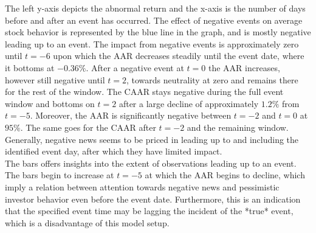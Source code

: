The left y-axis depicts the abnormal return and the x-axis is the number of days before and after an event has occurred. The effect of negative events on average stock behavior is represented by the blue line in the graph, and is mostly negative leading up to an event. The impact from negative events is approximately zero until $t = -6$ upon which the AAR decreases steadily until the event date, where it bottoms at $-0.36\%$. After a negative event at $t=0$ the AAR increases, however still negative until $t=2$, towards neutrality at zero and remains there for the rest of the window. The CAAR stays negative during the full event window and bottoms on $t=2$ after a large decline of approximately $1.2\%$ from  $t=-5$. Moreover, the AAR is significantly negative between $t=-2$ and $t=0$ at $95\%$. The same goes for the CAAR after $t=-2$ and the remaining window. Generally, negative news seems to be priced in leading up to and including the identified event day, after which they have limited impact. \\ 
The bars offers insights into the extent of observations leading up to an event. The bars begin to increase at $t=-5$ at which the AAR begins to decline, which imply a relation between attention towards negative news and pessimistic investor behavior even before the event date. Furthermore, this is an indication that the specified event time may be lagging the incident of the *true* event, which is a disadvantage of this model setup. 

